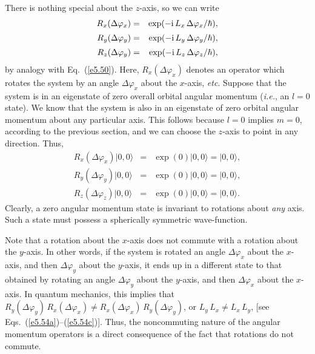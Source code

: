 There is nothing special about the $z$-axis, so we can write
\begin{eqnarray}\label{e5.54a}
R_x(\Delta\varphi_x) &=& \exp(-{\rm i}\,L_x \,\Delta\varphi_x/\hbar),\\[0.5ex]
R_y(\Delta\varphi_y) &=& \exp(-{\rm i}\,L_y \,\Delta\varphi_y/\hbar),\\[0.5ex]\label{e5.54c}
R_z(\Delta\varphi_y) &=& \exp(-{\rm i}\,L_z\, \Delta\varphi_z/\hbar),
\end{eqnarray}
by analogy with Eq.~(\ref{e5.50}). Here, $R_x(\Delta\varphi_x)$ denotes an operator
which rotates the system by an angle $\Delta\varphi_x$ about the $x$-axis, {\em etc}.
Suppose that the system is in an eigenstate of zero overall orbital angular momentum
({\em i.e.}, an $l=0$ state).
We know that the system is also in an eigenstate of zero orbital angular momentum 
about any particular axis. This follows because $l=0$ implies $m=0$, according
to  the
previous section, and we can choose the $z$-axis to point in any direction. 
Thus,
\begin{eqnarray}
R_x(\Delta \varphi_x) |0,0\rangle &=&\exp(0)|0,0\rangle = |0,0\rangle,\\[0.5ex]
R_y(\Delta \varphi_y) |0,0\rangle &=&\exp(0)|0,0\rangle = |0,0\rangle,\\[0.5ex]
R_z(\Delta \varphi_z) |0,0\rangle &=&\exp(0)|0,0\rangle = |0,0\rangle.
\end{eqnarray}
Clearly, a zero angular momentum state is invariant to rotations about {\em any}\/
axis.
Such a state  must possess a spherically symmetric wave-function. 

Note that a rotation about the $x$-axis does not commute with a rotation
about the $y$-axis. In other words, if the system is rotated an angle
$\Delta\varphi_x$ about the $x$-axis, and then $\Delta\varphi_y$ about the
$y$-axis, it ends up in a different state to that obtained by rotating
an angle $\Delta\varphi_y$ about the
$y$-axis, and then $\Delta\varphi_x$ about the $x$-axis. In quantum
mechanics, this implies that $R_y(\Delta\varphi_y)\,R_x(\Delta\varphi_x)
\neq R_x(\Delta\varphi_x)\,R_y(\Delta\varphi_y)$, or 
$L_y \,L_x \neq L_x\, L_y$, [see  Eqs.~(\ref{e5.54a})--(\ref{e5.54c})]. Thus, the noncommuting
nature of the angular momentum operators is a direct consequence
of  the fact that
rotations do not commute. 

